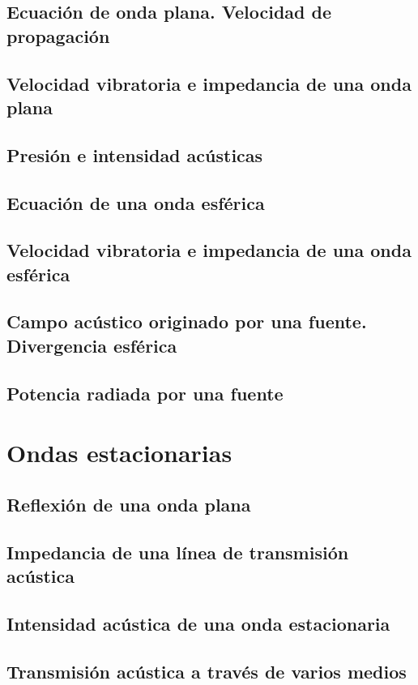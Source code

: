 \documentclass[a4paper]{book}
\begin{document}
\section{Ecuación de onda plana. Velocidad de propagación}
\section{Velocidad vibratoria e impedancia de una onda plana}
\section{Presión e intensidad acústicas}
\section{Ecuación de una onda esférica}
\section[Velocidad vibratoria e impedancia de una onda esférica]{Velocidad vibratoria e impedancia de una onda\\ esférica}
\section{Campo acústico originado por una fuente. Divergencia esférica}
\section{Potencia radiada por una fuente}

\chapter{Ondas estacionarias}
\section{Reflexión de una onda plana}
\section{Impedancia de una línea de transmisión acústica}
\section{Intensidad acústica de una onda estacionaria}
\section{Transmisión acústica a través de varios medios}
\end{document}
